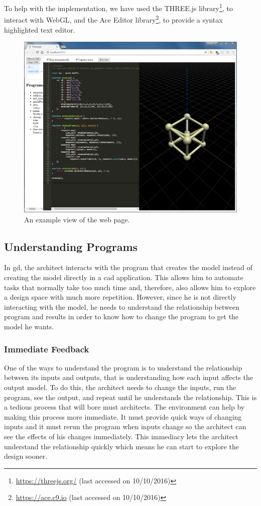 To help with the implementation, we have used the THREE.js library\footnote{\url{https://threejs.org/} (last accessed on 10/10/2016)}, to interact with WebGL\cite{marrin2011webgl}, and the Ace Editor library\footnote{\url{https://ace.c9.io} (last accessed on 10/10/2016)}, to provide a syntax highlighted text editor.


\begin{figure}
  \centering
  \includegraphics[width=12cm]{./images/webpage_view}
  \caption{An example view of the web page.}
  \label{fig:page:view}
\end{figure}


\subsection{Understanding Programs}
In \gls{gd}, the architect interacts with the program that creates the model instead of creating the model directly in a \gls{cad} application.
This allows him to automate tasks that normally take too much time and, therefore, also allows him to explore a design space with much more repetition.
However, since he is not directly interacting with the model, he needs to understand the relationship between program and results in order to know how to change the program to get the model he wants.


\subsubsection{Immediate Feedback}
\label{sec:immediate:feedback}
One of the ways to understand the program is to understand the relationship between its inputs and outputs, that is understanding how each input affects the output model.
To do this, the architect needs to change the inputs, run the program, see the output, and repeat until he understands the relationship.
This is a tedious process that will bore must architects.
The environment can help by making this process more immediate.
It must provide quick ways of changing inputs and it must rerun the program when inputs change so the architect can see the effects of his changes immediately.
This immediacy lets the architect understand the relationship quickly which means he can start to explore the design sooner.

